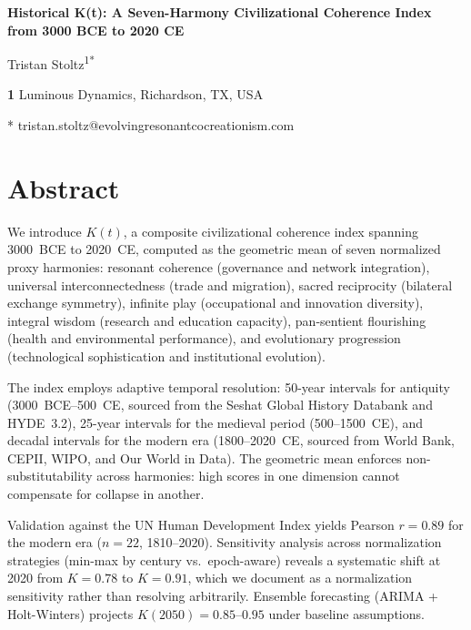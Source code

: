 \documentclass[10pt,letterpaper]{article}
\newcommand{\kt}{$K(t)$}
\begin{document}
\vspace*{0.2in}

\begin{flushleft}
{\Large\textbf{Historical K(t): A Seven-Harmony Civilizational Coherence Index from 3000 BCE to 2020 CE}}
\bigskip

Tristan Stoltz\textsuperscript{1*}

\bigskip

\textbf{1} Luminous Dynamics, Richardson, TX, USA

\bigskip

* tristan.stoltz@evolvingresonantcocreationism.com

\end{flushleft}

\section*{Abstract}

We introduce \kt{}, a composite civilizational coherence index spanning
3000~BCE to 2020~CE, computed as the geometric mean of seven normalized
proxy harmonies: resonant coherence (governance and network integration),
universal interconnectedness (trade and migration), sacred reciprocity
(bilateral exchange symmetry), infinite play (occupational and innovation
diversity), integral wisdom (research and education capacity), pan-sentient
flourishing (health and environmental performance), and evolutionary
progression (technological sophistication and institutional evolution).

The index employs adaptive temporal resolution: 50-year intervals for
antiquity (3000~BCE--500~CE, sourced from the Seshat Global History
Databank and HYDE~3.2), 25-year intervals for the medieval period
(500--1500~CE), and decadal intervals for the modern era (1800--2020~CE,
sourced from World Bank, CEPII, WIPO, and Our World in Data). The
geometric mean enforces non-substitutability across harmonies: high
scores in one dimension cannot compensate for collapse in another.

Validation against the UN Human Development Index yields Pearson
$r = 0.89$ for the modern era ($n = 22$, 1810--2020). Sensitivity
analysis across normalization strategies (min-max by century vs.\
epoch-aware) reveals a systematic shift at 2020 from $K = 0.78$
to $K = 0.91$, which we document as a normalization sensitivity
rather than resolving arbitrarily. Ensemble forecasting (ARIMA +
Holt-Winters) projects $K(2050) = 0.85$--$0.95$ under baseline
assumptions.
\end{document}
